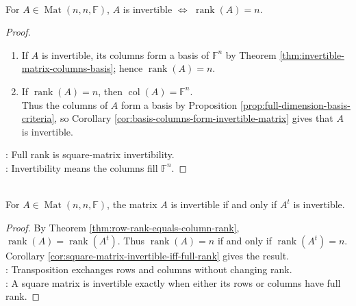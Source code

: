 \begin{corollary} \label{cor:square-matrix-invertible-iff-full-rank} \\
For $A\in\operatorname{Mat}(n,n,\mathbb{F})$, $A$ is invertible $\Longleftrightarrow$ $\operatorname{rank}(A)=n$.
\begin{proof}
\begin{enumerate}[label=\roman*.]
\setlength{\itemsep}{0pt}
\item[$(\Rightarrow)$] If $A$ is invertible, its columns form a basis of $\mathbb{F}^n$ by Theorem \ref{thm:invertible-matrix-columns-basis}; hence $\operatorname{rank}(A)=n$.
\item[$(\Leftarrow)$] If $\operatorname{rank}(A)=n$, then $\operatorname{col}(A)=\mathbb{F}^n$.\\
Thus the columns of $A$ form a basis by Proposition \ref{prop:full-dimension-basis-criteria}, so Corollary \ref{cor:basis-columns-form-invertible-matrix} gives that $A$ is invertible.
\end{enumerate}
: Full rank is square-matrix invertibility.\\
: Invertibility means the columns fill $\mathbb{F}^n$.
\end{proof}
\end{corollary}

\begin{corollary} \label{cor:transpose-invertible-iff} \\
For $A\in\operatorname{Mat}(n,n,\mathbb{F})$, the matrix $A$ is invertible if and only if $A^t$ is invertible.
\begin{proof}
By Theorem \ref{thm:row-rank-equals-column-rank}, $\operatorname{rank}(A)=\operatorname{rank}(A^t)$. Thus $\operatorname{rank}(A)=n$ if and only if $\operatorname{rank}(A^t)=n$.\\
Corollary \ref{cor:square-matrix-invertible-iff-full-rank} gives the result.\\
: Transposition exchanges rows and columns without changing rank.\\
: A square matrix is invertible exactly when either its rows or columns have full rank.
\end{proof}
\end{corollary}

